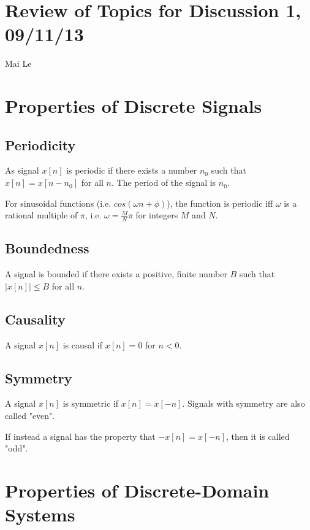 \documentclass[11pt]{article}
\begin{document}
\section*{Review of Topics for Discussion 1, 09/11/13}
Mai Le



\section{Properties of Discrete Signals}

\subsection{Periodicity}
As signal $x[n]$ is periodic if there exists a number $n_0$ such that $x[n]=x[n-n_0]$ for all $n$. The period of the signal is $n_0$.

For sinusoidal functions (i.e. $cos\left(\omega n + \phi\right)$), the function is periodic iff $\omega$ is a rational multiple of $\pi$, i.e. $\omega = \frac{M}{N}\pi$ for integers $M$ and $N$.

\subsection{Boundedness}
A signal is bounded if there exists a positive, finite number $B$ such that $|x[n]|  \leq B$ for all $n$. 

\subsection{Causality}
A signal $x[n]$ is causal if $x[n]=0$ for $n<0$.

\subsection{Symmetry}
A signal $x[n]$ is symmetric if $x[n] = x[-n]$. Signals with symmetry are also called "even".

If instead a signal has the property that $-x[n] = x[-n]$, then it is called "odd".


\section{Properties of Discrete-Domain Systems}
\end{document}
